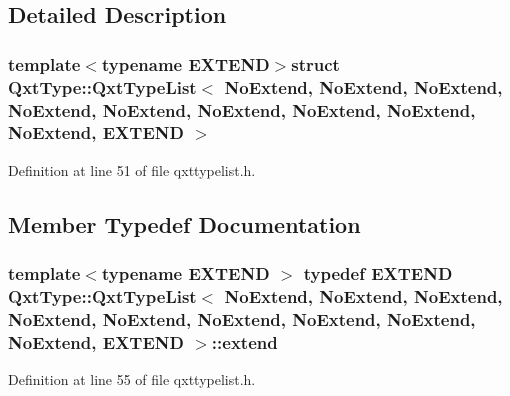 \subsection{Detailed Description}
\subsubsection*{template$<$typename E\-X\-T\-E\-N\-D$>$struct Qxt\-Type\-::\-Qxt\-Type\-List$<$ No\-Extend, No\-Extend, No\-Extend, No\-Extend, No\-Extend, No\-Extend, No\-Extend, No\-Extend, No\-Extend, E\-X\-T\-E\-N\-D $>$}



Definition at line 51 of file qxttypelist.\-h.



\subsection{Member Typedef Documentation}
\hypertarget{struct_qxt_type_1_1_qxt_type_list_3_01_no_extend_00_01_no_extend_00_01_no_extend_00_01_no_extendaa1bb8779fce2c4754d395885150af9f_a47b38788a648309f65fab6cbfa5070a2}{
\subsubsection[{extend}]{\setlength{\rightskip}{0pt plus 5cm}template$<$typename E\-X\-T\-E\-N\-D $>$ typedef E\-X\-T\-E\-N\-D {\bf Qxt\-Type\-::\-Qxt\-Type\-List}$<$ {\bf No\-Extend}, {\bf No\-Extend}, {\bf No\-Extend}, {\bf No\-Extend}, {\bf No\-Extend}, {\bf No\-Extend}, {\bf No\-Extend}, {\bf No\-Extend}, {\bf No\-Extend}, E\-X\-T\-E\-N\-D $>$\-::{\bf extend}}}\label{struct_qxt_type_1_1_qxt_type_list_3_01_no_extend_00_01_no_extend_00_01_no_extend_00_01_no_extendaa1bb8779fce2c4754d395885150af9f_a47b38788a648309f65fab6cbfa5070a2}


Definition at line 55 of file qxttypelist.\-h.

